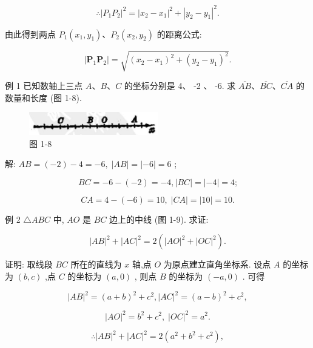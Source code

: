 \documentclass[lang=cn,newtx,10pt,scheme=chinese]{elegantbook}
\begin{document}
\[
  \therefore {\left| {P}_{1}{P}_{2}\right| }^{2} = {\left| {x}_{2} - {x}_{1}\right| }^{2} + {\left| {y}_{2} - {y}_{1}\right| }^{2}\text{.}
\]
\begin{corollary}[两点间距离公式]
由此得到两点 \({P}_{1}\left( {{x}_{1},{y}_{1}}\right) \text{、}{P}_{2}\left( {{x}_{2},{y}_{2}}\right)\) 的距离公式:

\[
  \left| {{\mathbf{P}}_{1}{\mathbf{P}}_{2}}\right| = \sqrt{{\left( {x}_{2} - {x}_{1}\right) }^{2} + {\left( {y}_{2} - {y}_{1}\right) }^{2}}.
\]
\end{corollary}
例 1 已知数轴上三点 \(A\text{、}B\text{、}C\) 的坐标分别是 4、 -2 、 -6. 求 \(\overline{AB}\text{、}\overline{BC}\text{、}\overline{CA}\) 的数量和长度 (图 1-8).

\begin{figure}[h]
  \centering
  \includegraphics[max width=0.5\textwidth]{images/01912cc2-ffb6-728e-9ae7-b113ff05c64b_10_794091.jpg}
  \caption{图 1-8}
\end{figure}



解: \({AB} = \left( {-2}\right) - 4 = - 6,\;\left| {AB}\right| = \left| {-6}\right| = 6\) ;

\[
    {BC} = - 6 - \left( {-2}\right) = - 4,\left| {BC}\right| = \left| {-4}\right| = 4\text{;}
\]

\[
    {CA} = 4 - \left( {-6}\right) = {10},\;\left| {CA}\right| = \left| {10}\right| = {10}.
\]

例 2 \(\bigtriangleup {ABC}\) 中, \({AO}\) 是 \({BC}\) 边上的中线 (图 1-9). 求证:

\[
    {\left| AB\right| }^{2} + {\left| AC\right| }^{2} = 2\left( {{\left| AO\right| }^{2} + {\left| OC\right| }^{2}}\right) .
\]

证明: 取线段 \({BC}\) 所在的直线为 \(x\) 轴,点 \(O\) 为原点建立直角坐标系. 设点 \(A\) 的坐标为 \(\left( {b,c}\right)\) ,点 \(C\) 的坐标为 \(\left( {a,0}\right)\) , 则点 \(B\) 的坐标为 \(\left( {-a,0}\right)\) . 可得

\[
    {\left| AB\right| }^{2} = {\left( a + b\right) }^{2} + {c}^{2},{\left| AC\right| }^{2} = {\left( a - b\right) }^{2} + {c}^{2},
\]

\[
    {\left| AO\right| }^{2} = {b}^{2} + {c}^{2},\;{\left| OC\right| }^{2} = {a}^{2}.
\]

\[
  \therefore {\left| AB\right| }^{2} + {\left| AC\right| }^{2} = 2\left( {{a}^{2} + {b}^{2} + {c}^{2}}\right) ,
\]
\end{document}
